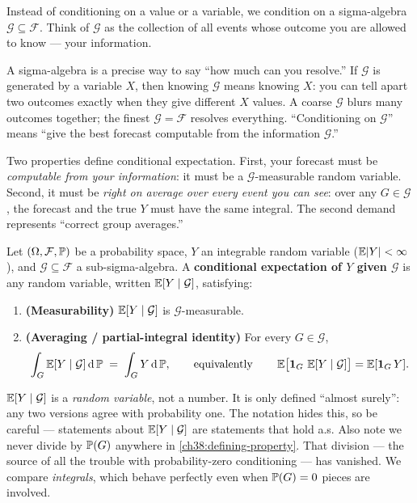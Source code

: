 Instead of conditioning on a value or a variable, we condition on a sigma-algebra $\mathcal{G} \subseteq \mathcal{F}$. Think of
$\mathcal{G}$ as the collection of all events whose outcome you are allowed to know --- your
information.

\begin{intuitionbox}
A sigma-algebra is a precise way to say ``how much can you resolve.'' If $\mathcal{G}$ is generated
by a variable $X$, then knowing $\mathcal{G}$ means knowing $X$: you can tell apart two outcomes
exactly when they give different $X$ values. A coarse $\mathcal{G}$ blurs many outcomes together; the
finest $\mathcal{G} = \mathcal{F}$ resolves everything. ``Conditioning on $\mathcal{G}$'' means
``give the best forecast computable from the information $\mathcal{G}$.''
\end{intuitionbox}

Two properties define conditional expectation. First, your forecast must be \emph{computable from your
information}: it must be a $\mathcal{G}$-measurable random variable. Second, it must be \emph{right on
average over every event you can see}: over any $G \in \mathcal{G}$, the forecast and the true $Y$
must have the same integral. The second demand represents ``correct group averages.''

\begin{definition}
\label{ch38:def-cond-exp}
Let $(\Omega, \mathcal{F}, \P)$ be a probability space, $Y$ an integrable random variable
($\E\abs{Y} < \infty$), and $\mathcal{G} \subseteq \mathcal{F}$ a sub-sigma-algebra. A
\textbf{conditional expectation of $Y$ given $\mathcal{G}$} is any random variable, written
$\E[Y \given \mathcal{G}]$, satisfying:
\begin{enumerate}
  \item \textbf{(Measurability)} $\E[Y \given \mathcal{G}]$ is $\mathcal{G}$-measurable.
  \item \textbf{(Averaging / partial-integral identity)} For every $G \in \mathcal{G}$,
  \begin{equation}
  \label{ch38:defining-property}
    \int_G \E[Y \given \mathcal{G}] \,\dd\P \;=\; \int_G Y \,\dd\P,
    \qquad \text{equivalently} \qquad
    \E\!\big[\ind_G\,\E[Y\given\mathcal{G}]\big] = \E[\ind_G\, Y].
  \end{equation}
\end{enumerate}
\end{definition}

\begin{trapbox}
$\E[Y \given \mathcal{G}]$ is a \emph{random variable}, not a number. It is only defined ``almost
surely'': any two versions agree with probability one. The notation hides this, so be careful ---
statements about $\E[Y\given\mathcal{G}]$ are statements that hold a.s. Also note we never divide by
$\P(G)$ anywhere in \eqref{ch38:defining-property}. That division --- the source of all the trouble
with probability-zero conditioning --- has vanished. We compare \emph{integrals}, which behave
perfectly even when $\P(G) = 0$ pieces are involved.
\end{trapbox}

